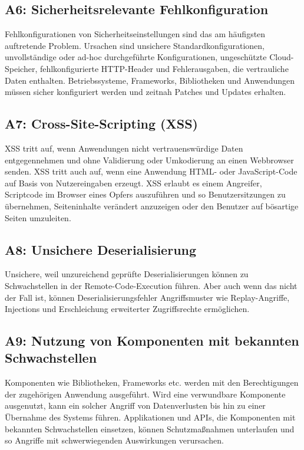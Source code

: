\documentclass[12pt,oneside,a4paper,parskip]{scrbook}
\begin{document}
\subsection{A6: Sicherheitsrelevante Fehlkonfiguration}
Fehlkonfigurationen von Sicherheitseinstellungen sind das am häufigsten auftretende Problem.
Ursachen sind unsichere Standardkonfigurationen, unvollständige oder ad-hoc durchgeführte
Konfigurationen, ungeschützte Cloud-Speicher, fehlkonfigurierte HTTP-Header und Fehlerausgaben,
die vertrauliche Daten enthalten. Betriebssysteme, Frameworks, Bibliotheken und Anwendungen
müssen sicher konfiguriert werden und zeitnah Patches und Updates erhalten.

\subsection{A7: Cross-Site-Scripting (XSS)}
XSS tritt auf, wenn Anwendungen nicht vertrauenswürdige Daten entgegennehmen und ohne
Validierung oder Umkodierung an einen Webbrowser senden. XSS tritt auch auf, wenn eine
Anwendung HTML- oder JavaScript-Code auf Basis von Nutzereingaben erzeugt. XSS erlaubt es
einem Angreifer, Scriptcode im Browser eines Opfers auszuführen und so Benutzersitzungen zu
übernehmen, Seiteninhalte verändert anzuzeigen oder den Benutzer auf bösartige Seiten
umzuleiten.

\subsection{A8: Unsichere Deserialisierung}
Unsichere, weil unzureichend geprüfte Deserialisierungen können zu Schwachstellen in der
Remote-Code-Execution führen. Aber auch wenn das nicht der Fall ist, können
Deserialisierungsfehler Angriffsmuster wie Replay-Angriffe, Injections und Erschleichung
erweiterter Zugriffsrechte ermöglichen.

\subsection{A9: Nutzung von Komponenten mit bekannten Schwachstellen}
Komponenten wie Bibliotheken, Frameworks etc. werden mit den Berechtigungen der zugehörigen
Anwendung ausgeführt. Wird eine verwundbare Komponente ausgenutzt, kann ein solcher
Angriff von Datenverlusten bis hin zu einer Übernahme des Systems führen. Applikationen und
APIs, die Komponenten mit bekannten Schwachstellen einsetzen, können Schutzmaßnahmen
unterlaufen und so Angriffe mit schwerwiegenden Auswirkungen verursachen.
\end{document}
